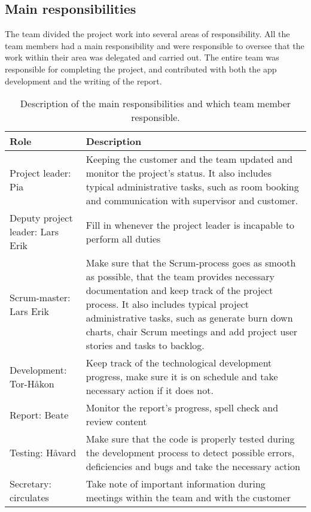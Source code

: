 \newpage
\subsection{Main responsibilities}

The team divided the project work into several areas of responsibility. All the team members had a main responsibility and were responsible to oversee that the work within their area was delegated and carried out. The entire team was responsible for completing the project, and contributed with both the app development and the writing of the report.


\begin{table}[H]
\centering
{}
\begin{tabular}{|l|p{9.7cm}|}
\hline
\textbf{Role} & \textbf{Description}\\\hline
Project leader: Pia & Keeping the customer and the team updated and monitor the project's status. It also includes typical administrative tasks, such as room booking and communication with supervisor and customer.\\\hline
Deputy project leader: Lars Erik & Fill in whenever the project leader is incapable to perform all duties\\\hline
Scrum-master: Lars Erik & Make sure that the Scrum-process goes as smooth as possible, that the team provides necessary documentation and keep track of the project process. It also includes typical project administrative tasks, such as generate burn down charts, chair Scrum meetings and add project user stories and tasks to backlog.\\\hline
Development: Tor-Håkon & Keep track of the technological development progress, make sure it is on schedule and take necessary action if it does not.\\\hline
Report: Beate & Monitor the report's progress, spell check and review content\\\hline
Testing: Håvard & Make sure that the code is properly tested during the development process to detect possible errors, deficiencies and bugs and take the necessary action \\\hline
Secretary: circulates & Take note of important information during meetings within the team and with the customer\\\hline
\end{tabular}
\caption{Description of the main responsibilities and which team member responsible.}
\label{tab:mainResponsibilities}
\end{table}
